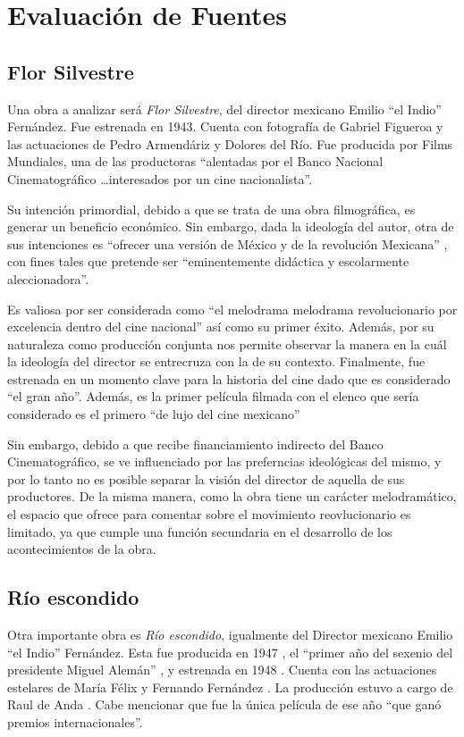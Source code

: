 \section{Evaluación de Fuentes}
\subsection{Flor Silvestre}
Una obra a analizar será \textit{Flor Silvestre}, del director mexicano Emilio ``el Indio'' Fernández. 
Fue estrenada en 1943. Cuenta con fotografía de Gabriel Figueroa y las actuaciones de Pedro Armendáriz y Dolores del Río. Fue producida por Films Mundiales, una de las productoras ``alentadas por el Banco Nacional Cinematográfico \ldots interesados por un cine nacionalista''. %

Su intención primordial, debido a que se trata de una obra filmográfica, es generar un beneficio económico.
Sin embargo, dada la ideología del autor, otra de sus intenciones es ``ofrecer una versión de México y de la revolución Mexicana''%
, con fines tales que pretende ser ``eminentemente didáctica y escolarmente aleccionadora''. %

Es valiosa por ser considerada como ``el melodrama melodrama revolucionario por excelencia dentro del cine
nacional'' %
así como su primer éxito. %
Además, por su naturaleza como producción conjunta nos permite observar la manera en la cuál la ideología del director se entrecruza con la de su contexto. 
Finalmente, fue estrenada en un momento clave para la historia del cine dado que es considerado ``el gran año''. %
Además, es la primer película filmada con el elenco que sería considerado es el primero ``de lujo del cine mexicano''%

Sin embargo, debido a que recibe financiamiento indirecto del Banco Cinematográfico, %
se ve influenciado por las preferncias ideológicas del mismo, y por lo tanto no es posible separar la visión del director de aquella de sus productores. 
De la misma manera, como la obra tiene un carácter melodramático, el espacio que ofrece para comentar sobre el movimiento reovlucionario es limitado, ya que cumple una función secundaria en el desarrollo de los acontecimientos de la obra.%
 

\subsection{Río escondido}
Otra importante obra es \textit{Río escondido}, igualmente del Director mexicano Emilio ``el Indio'' Fernández. Esta fue producida en 1947 %
, el ``primer año del sexenio del presidente Miguel Alemán''
, y estrenada en 1948 %
. Cuenta con las actuaciones estelares de María Félix y Fernando Fernández %
. La producción estuvo a cargo de Raul de Anda %
. Cabe mencionar que fue la única película de ese año ``que ganó premios internacionales''. %

